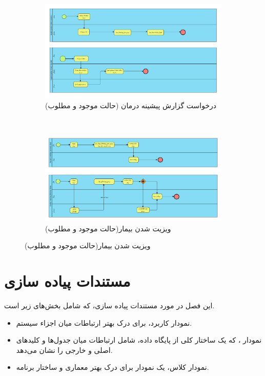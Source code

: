 \documentclass[a4paper,12pt]{report}
\begin{document}
	\pagebreak
	\begin{figure}[!h]
		\label{fig2:sec6:chap1}
		\begin{center}
			\begin{subfigure}[t]{\textwidth}
				\includegraphics[width=\linewidth]{diagrams/requestPatientHistory.pdf}
				\caption{درخواست گزارش پیشینه درمان (حالت موجود و مطلوب)}
				\label{subfig3:fig1:sec6:chap1}
			\end{subfigure}	\\
			\begin{subfigure}[t]{\textwidth}
				\includegraphics[width=\textwidth]{diagrams/visiting.pdf}
				\caption{ویزیت شدن بیمار(حالت موجود و مطلوب)}
				\label{subfig4:fig1:sec6:chap1}
			\end{subfigure}	
		\end{center}
	\end{figure}

	\pagebreak
	\chapter{
	مستندات پیاده سازی}
	\label{chp2}
	\noindent
	این فصل در مورد مستندات پیاده سازی، که شامل بخش‌های زیر است.
	\begin{itemize}
		\item 
		نمودار کاربرد، برای درک بهتر ارتباطات میان اجزاء سیستم.
		\item
		نمودار 
		، که یک ساختار کلی از پایگاه داده، شامل ارتباطات میان جدول‌ها و کلید‌های اصلی و خارجی را نشان می‌دهد.
		\item
		نمودار کلاس،‌ یک نمودار برای درک بهتر معماری و ساختار برنامه.
	\end{itemize}
\end{document}
